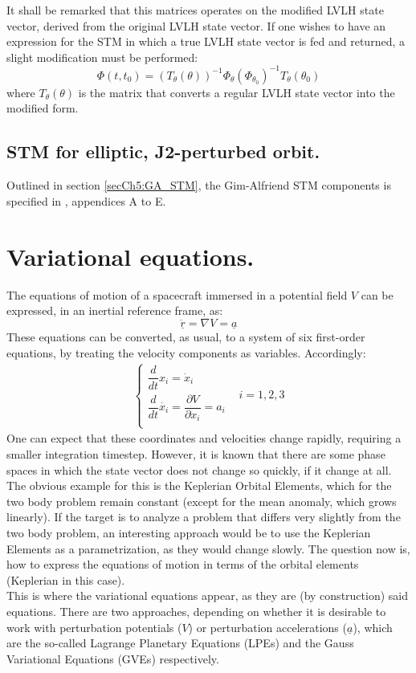 	\indent It shall be remarked that this matrices operates on the modified LVLH state vector, derived from the original LVLH state vector. If one wishes to have an expression for the STM in which a true LVLH state vector is fed and returned, a slight modification must be performed:
	\begin{equation}
	\Phi(t, t_0) =\left( T_{\theta}(\theta)\right)^{-1} \Phi_{\theta} \left(\Phi_{\theta_0}\right)^{-1} T_{\theta}(\theta_0)
	\end{equation}
	\noindent where $T_{\theta}(\theta)$ is the matrix that converts a regular LVLH state vector into the modified form.
	\subsection{STM for elliptic, J2-perturbed orbit.}
	\indent Outlined in section \ref{secCh5:GA_STM}, the Gim-Alfriend STM components is specified in \cite{GA_STM}, appendices A to E.
\section{Variational equations.}\label{secAppE:Variational}
%
\indent The equations of motion of a spacecraft immersed in a potential field $V$ can be expressed, in an inertial reference frame, as:
%
\[
\ddot{\underline{r}} = \nabla V = \underline{a}
\]
%
\indent These equations can be converted, as usual, to a system of six first-order equations, by treating the velocity components as variables. Accordingly:
%
\begin{equation}
\begin{array}{lc}
\left\{\begin{array}{lll}
\dfrac{d}{dt} x_i = \dot{x}_i \\[1.2em]
\dfrac{d}{dt} \dot{x_i}= \dfrac{\partial V}{\partial x_i} = a_i \\
\end{array}\right. & i = 1, 2, 3
\end{array}
\label{eqAppE:EqsMotion1}
\end{equation}
%
\indent One can expect that these coordinates and velocities change rapidly, requiring a smaller integration timestep. However, it is known that there are some phase spaces in which the state vector does not change so quickly, if it change at all. The obvious example for this is the Keplerian Orbital Elements, which for the two body problem remain constant (except for the mean anomaly, which grows linearly). If the target is to analyze a problem that differs very slightly from the two body problem, an interesting approach would be to use the Keplerian Elements as a parametrization, as they would change slowly. The question now is, how to express the equations of motion in terms of the orbital elements (Keplerian in this case). \\
%
\indent This is where the variational equations appear, as they are (by construction) said equations. There are two approaches, depending on whether it is desirable to work with perturbation potentials ($V$) or perturbation accelerations ($\underline{a}$), which are the so-called Lagrange Planetary Equations (LPEs) and the Gauss Variational Equations (GVEs) respectively.
%
